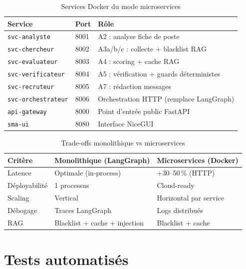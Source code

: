 \documentclass[12pt,a4paper]{report}
\begin{document}
\begin{table}[H]
\centering
\caption{Services Docker du mode microservices}
\label{tab:microservices}
\begin{tabularx}{\textwidth}{L{3.5cm}C{1.8cm}L{7.5cm}}
\toprule
\textbf{Service} & \textbf{Port} & \textbf{Rôle} \\
\midrule
\texttt{svc-analyste} & 8001 & A2 : analyse fiche de poste \\
\texttt{svc-chercheur} & 8002 & A3a/b/c : collecte + blacklist RAG \\
\texttt{svc-evaluateur} & 8003 & A4 : scoring + cache RAG \\
\texttt{svc-verificateur} & 8004 & A5 : vérification + guards déterministes \\
\texttt{svc-recruteur} & 8005 & A7 : rédaction messages \\
\texttt{svc-orchestrateur} & 8006 & Orchestration HTTP (remplace LangGraph) \\
\texttt{api-gateway} & 8000 & Point d'entrée public FastAPI \\
\texttt{sma-ui} & 8080 & Interface NiceGUI \\
\bottomrule
\end{tabularx}
\end{table}

\begin{table}[H]
\centering
\caption{Trade-offs monolithique vs microservices}
\label{tab:tradeoffs}
\begin{tabularx}{\textwidth}{L{3cm}L{5.5cm}L{5cm}}
\toprule
\textbf{Critère} & \textbf{Monolithique (LangGraph)} & \textbf{Microservices (Docker)} \\
\midrule
Latence & Optimale (in-process) & +30--50\,\% (HTTP) \\
Déployabilité & 1 processus & Cloud-ready \\
Scaling & Vertical & Horizontal par service \\
Débogage & Traces LangGraph & Logs distribués \\
RAG & Blacklist + cache + injection & Blacklist + cache \\
\bottomrule
\end{tabularx}
\end{table}

\section{Tests automatisés}
\end{document}
